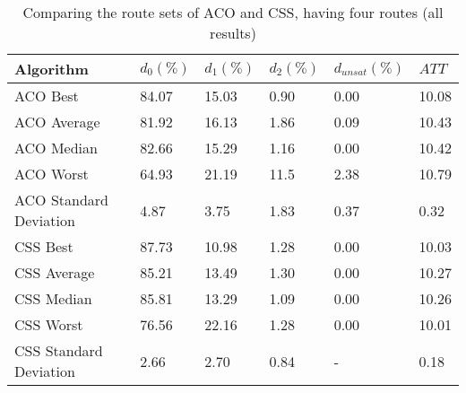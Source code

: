     \begin{table}[H]
    \centering
    \begin{tabular}{|l||l|l|l|l|l|}
    \hline
    Algorithm & $d_0(\%)$ & $d_1(\%)$ & $d_2(\%)$ & $d_{unsat}(\%)$ & $ATT$ \\
    \hline
    ACO Best & 84.07 & 15.03 & 0.90 & 0.00 & 10.08\\
    ACO Average & 81.92 & 16.13 & 1.86 & 0.09 & 10.43\\
    ACO Median & 82.66 & 15.29 & 1.16 & 0.00 & 10.42\\
    ACO Worst & 64.93 & 21.19 & 11.5 & 2.38 & 10.79\\
    ACO Standard Deviation & 4.87 & 3.75 & 1.83 & 0.37 & 0.32\\
    \hline
    \hline
    CSS Best & 87.73 & 10.98 & 1.28 & 0.00 & 10.03\\
    CSS Average & 85.21 & 13.49 & 1.30 & 0.00 & 10.27\\
    CSS Median & 85.81 & 13.29 & 1.09 & 0.00 & 10.26\\
    CSS Worst & 76.56 & 22.16 & 1.28 & 0.00 & 10.01\\
    CSS Standard Deviation & 2.66 & 2.70 & 0.84 & - & 0.18\\
    \hline
    \end{tabular}
    \caption {Comparing the route sets of ACO and CSS, having four routes (all results)}
    \label{table:performanceComparison_ACOFull}
    \end{table}


